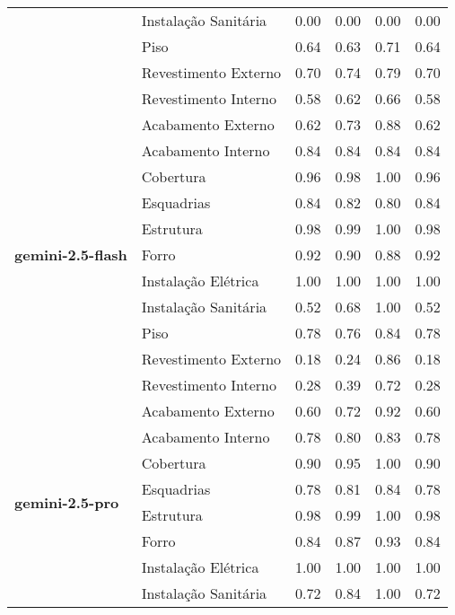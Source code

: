 \begin{table}[htbp]
\begin{tabular}{llcccc}
     & \multirow{1}{*}{Instalação Sanitária} & 0.00 & 0.00 & 0.00 & 0.00 \\
     & \multirow{1}{*}{Piso} & 0.64 & 0.63 & 0.71 & 0.64 \\
     & \multirow{1}{*}{Revestimento Externo} & 0.70 & 0.74 & 0.79 & 0.70 \\
     & \multirow{1}{*}{Revestimento Interno} & 0.58 & 0.62 & 0.66 & 0.58 \\
    \midrule
    \multirow{11}{*}{\textbf{gemini-2.5-flash}} & \multirow{1}{*}{Acabamento Externo} & 0.62 & 0.73 & 0.88 & 0.62 \\
     & \multirow{1}{*}{Acabamento Interno} & 0.84 & 0.84 & 0.84 & 0.84 \\
     & \multirow{1}{*}{Cobertura} & 0.96 & 0.98 & 1.00 & 0.96 \\
     & \multirow{1}{*}{Esquadrias} & 0.84 & 0.82 & 0.80 & 0.84 \\
     & \multirow{1}{*}{Estrutura} & 0.98 & 0.99 & 1.00 & 0.98 \\
     & \multirow{1}{*}{Forro} & 0.92 & 0.90 & 0.88 & 0.92 \\
     & \multirow{1}{*}{Instalação Elétrica} & 1.00 & 1.00 & 1.00 & 1.00 \\
     & \multirow{1}{*}{Instalação Sanitária} & 0.52 & 0.68 & 1.00 & 0.52 \\
     & \multirow{1}{*}{Piso} & 0.78 & 0.76 & 0.84 & 0.78 \\
     & \multirow{1}{*}{Revestimento Externo} & 0.18 & 0.24 & 0.86 & 0.18 \\
     & \multirow{1}{*}{Revestimento Interno} & 0.28 & 0.39 & 0.72 & 0.28 \\
    \midrule
    \multirow{11}{*}{\textbf{gemini-2.5-pro}} & \multirow{1}{*}{Acabamento Externo} & 0.60 & 0.72 & 0.92 & 0.60 \\
     & \multirow{1}{*}{Acabamento Interno} & 0.78 & 0.80 & 0.83 & 0.78 \\
     & \multirow{1}{*}{Cobertura} & 0.90 & 0.95 & 1.00 & 0.90 \\
     & \multirow{1}{*}{Esquadrias} & 0.78 & 0.81 & 0.84 & 0.78 \\
     & \multirow{1}{*}{Estrutura} & 0.98 & 0.99 & 1.00 & 0.98 \\
     & \multirow{1}{*}{Forro} & 0.84 & 0.87 & 0.93 & 0.84 \\
     & \multirow{1}{*}{Instalação Elétrica} & 1.00 & 1.00 & 1.00 & 1.00 \\
     & \multirow{1}{*}{Instalação Sanitária} & 0.72 & 0.84 & 1.00 & 0.72 \\

\end{tabular}
\end{table}
